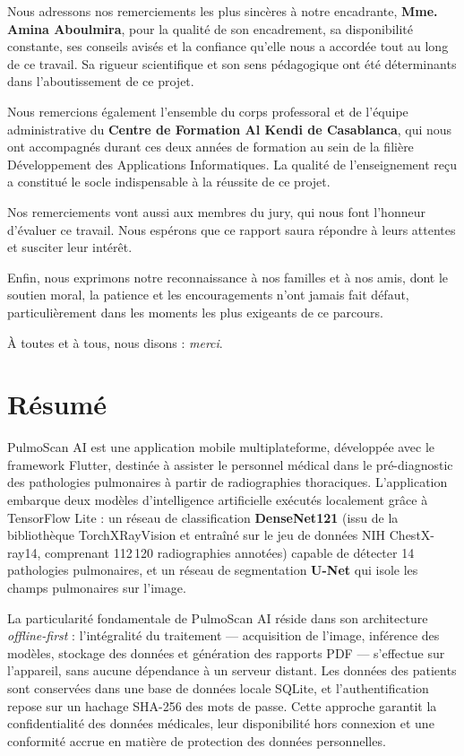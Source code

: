 \documentclass[12pt,a4paper]{report}
\begin{document}
\bigskip
Nous adressons nos remerciements les plus sincères à notre encadrante, \textbf{Mme. Amina Aboulmira}, pour la qualité de son encadrement, sa disponibilité constante, ses conseils avisés et la confiance qu'elle nous a accordée tout au long de ce travail. Sa rigueur scientifique et son sens pédagogique ont été déterminants dans l'aboutissement de ce projet.

\bigskip
Nous remercions également l'ensemble du corps professoral et de l'équipe administrative du \textbf{Centre de Formation Al Kendi de Casablanca}, qui nous ont accompagnés durant ces deux années de formation au sein de la filière Développement des Applications Informatiques. La qualité de l'enseignement reçu a constitué le socle indispensable à la réussite de ce projet.

\bigskip
Nos remerciements vont aussi aux membres du jury, qui nous font l'honneur d'évaluer ce travail. Nous espérons que ce rapport saura répondre à leurs attentes et susciter leur intérêt.

\bigskip
Enfin, nous exprimons notre reconnaissance à nos familles et à nos amis, dont le soutien moral, la patience et les encouragements n'ont jamais fait défaut, particulièrement dans les moments les plus exigeants de ce parcours.

\bigskip
À toutes et à tous, nous disons : \emph{merci}.

\chapter*{Résumé}
\thispagestyle{plain}

PulmoScan AI est une application mobile multiplateforme, développée avec le framework Flutter, destinée à assister le personnel médical dans le pré-diagnostic des pathologies pulmonaires à partir de radiographies thoraciques. L'application embarque deux modèles d'intelligence artificielle exécutés localement grâce à TensorFlow Lite : un réseau de classification \textbf{DenseNet121} (issu de la bibliothèque TorchXRayVision et entraîné sur le jeu de données NIH ChestX-ray14, comprenant 112\,120 radiographies annotées) capable de détecter 14 pathologies pulmonaires, et un réseau de segmentation \textbf{U-Net} qui isole les champs pulmonaires sur l'image.

\bigskip
La particularité fondamentale de PulmoScan AI réside dans son architecture \textit{offline-first} : l'intégralité du traitement --- acquisition de l'image, inférence des modèles, stockage des données et génération des rapports PDF --- s'effectue sur l'appareil, sans aucune dépendance à un serveur distant. Les données des patients sont conservées dans une base de données locale SQLite, et l'authentification repose sur un hachage SHA-256 des mots de passe. Cette approche garantit la confidentialité des données médicales, leur disponibilité hors connexion et une conformité accrue en matière de protection des données personnelles.
\end{document}
